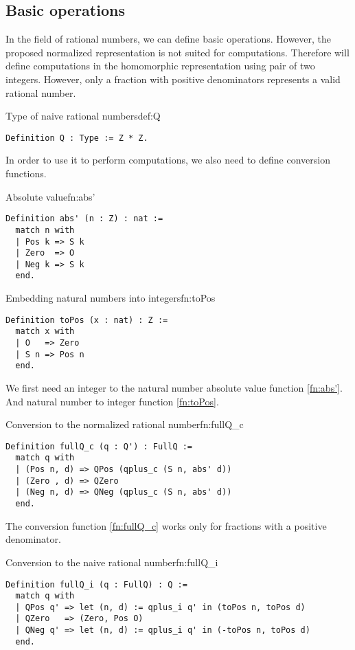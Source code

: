 \subsection{Basic operations}
In the field of rational numbers, we can define basic operations. However, the proposed normalized representation is not suited for computations. Therefore will define computations in the homomorphic representation using pair of two integers. However, only a fraction with positive denominators represents a valid rational number.
\begin{defi}{Type of naive rational numbers}{def:Q}
\begin{verbatim}
Definition Q : Type := Z * Z.
\end{verbatim}
\end{defi}
In order to use it to perform computations, we also need to define conversion functions.
\begin{func}{Absolute value}{fn:abs'}
\begin{verbatim}
Definition abs' (n : Z) : nat :=
  match n with
  | Pos k => S k
  | Zero  => O
  | Neg k => S k
  end.
\end{verbatim}
\end{func}
\begin{func}{Embedding natural numbers into integers}{fn:toPos}
\begin{verbatim}
Definition toPos (x : nat) : Z :=
  match x with
  | O   => Zero
  | S n => Pos n
  end.
\end{verbatim}
\end{func}
We first need an integer to the natural number absolute value function \ref{fn:abs'}. And natural number to integer function \ref{fn:toPos}.
\begin{func}{Conversion to the normalized rational number}{fn:fullQ_c}
\begin{verbatim}
Definition fullQ_c (q : Q') : FullQ :=
  match q with
  | (Pos n, d) => QPos (qplus_c (S n, abs' d))
  | (Zero , d) => QZero
  | (Neg n, d) => QNeg (qplus_c (S n, abs' d))
  end.
\end{verbatim}
\end{func}
The conversion function \ref{fn:fullQ_c} works only for fractions with a positive denominator.
\begin{func}{Conversion to the naive rational number}{fn:fullQ_i}
\begin{verbatim}
Definition fullQ_i (q : FullQ) : Q :=
  match q with
  | QPos q' => let (n, d) := qplus_i q' in (toPos n, toPos d)
  | QZero   => (Zero, Pos O)
  | QNeg q' => let (n, d) := qplus_i q' in (-toPos n, toPos d)
  end.
\end{verbatim}
\end{func}
